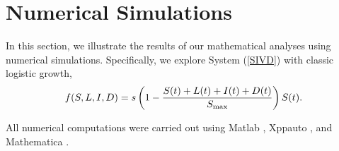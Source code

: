 \documentclass{CMHPhD-SIVD}
\begin{document}
\section{Numerical Simulations}\label{sec4}
In this section, we illustrate the results of our mathematical analyses using numerical simulations.
Specifically,  we explore System (\ref{SIVD}) with classic logistic growth,
$$f(S, L, I, D) = s\left(1-\frac{S(t)+L(t)+I(t)+D(t)}{S_{\text{max}}}\right)S(t).$$

All numerical computations were carried out using Matlab \cite{shampine2001solving}, Xppauto \cite{ermentrout2003simulating}, and Mathematica \cite{wellin2005introduction,hazrat2010mathematica}.
\end{document}

